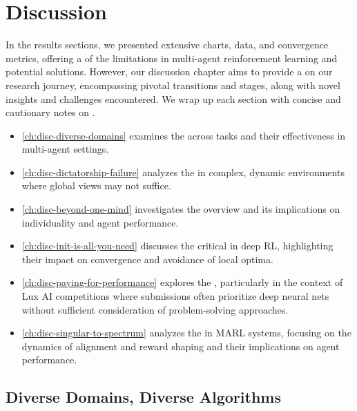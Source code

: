 \chapter{Discussion}
\label{ch:disc}

\noindent In the results sections, we presented extensive charts, data, and convergence metrics, offering a  of the limitations in multi-agent reinforcement learning and potential solutions. However, our discussion chapter aims to provide a  on our research journey, encompassing pivotal transitions and stages, along with novel insights and challenges encountered. We wrap up each section with concise  and cautionary notes on .

\begin{itemize}

\item \autoref{ch:disc-diverse-domains} examines the  across tasks and their effectiveness in multi-agent settings.
\item \autoref{ch:disc-dictatorship-failure} analyzes the  in complex, dynamic environments where global views may not suffice.
\item \autoref{ch:disc-beyond-one-mind} investigates the  overview and its implications on individuality and agent performance.
\item \autoref{ch:disc-init-is-all-you-need} discusses the critical  in deep RL, highlighting their impact on convergence and avoidance of local optima.
\item \autoref{ch:disc-paying-for-performance} explores the , particularly in the context of Lux AI competitions where submissions often prioritize deep neural nets without sufficient consideration of problem-solving approaches.
\item \autoref{ch:disc-singular-to-spectrum} analyzes the  in MARL systems, focusing on the dynamics of alignment and reward shaping and their implications on agent performance.

\end{itemize}

\section{Diverse Domains, Diverse Algorithms}
\label{ch:disc-diverse-domains}

